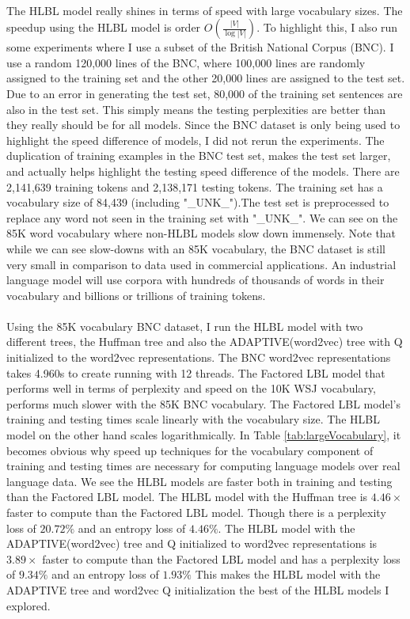 \paragraph{}
The HLBL model really shines in terms of speed with large vocabulary sizes. The speedup using the HLBL model is order $O(\frac{|V|}{\log|V|})$. To highlight this, I also run some experiments where I use a subset of the British National Corpus (BNC). I use a random 120,000 lines of the BNC, where 100,000 lines are randomly assigned to the training set and the other 20,000 lines are assigned to the test set. Due to an error in generating the test set, 80,000 of the training set sentences are also in the test set. This simply means the testing perplexities are better than they really should be for all models. Since the BNC dataset is only being used to highlight the speed difference of models, I did not rerun the experiments. The duplication of training examples in the BNC test set, makes the test set larger, and actually helps highlight the testing speed difference of the models. There are 2,141,639 training tokens and 2,138,171 testing tokens. The training set has a vocabulary size of 84,439 (including "\_UNK\_").The test set is preprocessed to replace any word not seen in the training set with "\_UNK\_". We can see on the 85K word vocabulary where non-HLBL models slow down immensely. Note that while we can see slow-downs with an 85K vocabulary, the BNC dataset is still very small in comparison to data used in commercial applications. An industrial language model will use corpora with hundreds of thousands of words in their vocabulary and billions or trillions of training tokens.

\paragraph{}
Using the 85K vocabulary BNC dataset, I run the HLBL model with two different trees, the Huffman tree and also the ADAPTIVE(word2vec) tree with Q initialized to the word2vec representations. The BNC word2vec representations takes 4.960s to create running with 12 threads. 
The Factored LBL model that performs well in terms of perplexity and speed on the 10K WSJ vocabulary, performs much slower with the 85K BNC vocabulary. The Factored LBL model's training and testing times scale linearly with the vocabulary size. The HLBL model on the other hand scales logarithmically. In Table \ref{tab:largeVocabulary}, it becomes obvious why speed up techniques for the vocabulary component of training and testing times are necessary for computing language models over real language data. We see the HLBL models are faster both in training and testing than the Factored LBL model. The HLBL model with the Huffman tree is $4.46\times$ faster to compute than the Factored LBL model. Though there is a perplexity loss of $20.72\%$ and an entropy loss of $4.46\%$. The HLBL model with the ADAPTIVE(word2vec) tree and Q initialized to word2vec representations is $3.89\times$ faster to compute than the Factored LBL model and has a perplexity loss of $9.34\%$ and an entropy loss of $1.93\%$ This makes the HLBL model with the ADAPTIVE tree and word2vec Q initialization the best of the HLBL models I explored.

